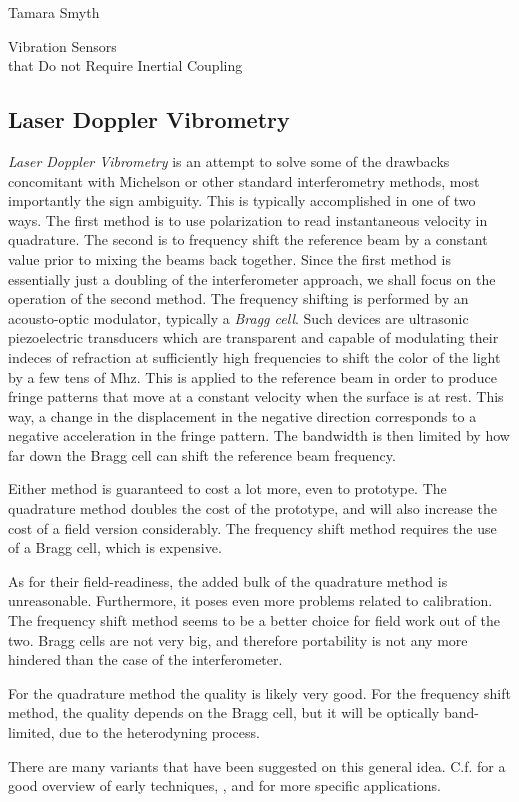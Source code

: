 \documentclass[a4paper,10pt]{report}
\numberwithin{equation}{section}
\begin{document}
\begin{chapter}{Tamara Smyth}
\begin{section}{Vibration Sensors \\that Do not Require Inertial Coupling}
 \subsection{Laser Doppler Vibrometry}
 \emph{Laser Doppler Vibrometry} is an attempt to solve some of the drawbacks concomitant with Michelson or other standard interferometry methods, most importantly the sign ambiguity. \cite{Giuliani2003}
 This is typically accomplished in one of two ways. The first method is to use polarization to read instantaneous velocity in quadrature. The second is to frequency shift the reference beam by a constant value prior to mixing the beams back together.\cite{Giuliani2003}
 Since the first method is essentially just a doubling of the interferometer approach, we shall focus on the operation of the second method. The frequency shifting is performed by an acousto-optic modulator, typically a \emph{Bragg cell}. Such devices are ultrasonic piezoelectric transducers which are transparent and capable of modulating their indeces of refraction at sufficiently high frequencies to shift the color of the light by a few tens of Mhz. This is applied to the reference beam in order to produce fringe patterns that move at a constant velocity when the surface is at rest. This way, a change in the displacement in the negative direction corresponds to a negative acceleration in the fringe pattern. The bandwidth is then limited by how far down the Bragg cell can shift the reference beam frequency.\cite[p.~241]{Baker1990}
 
 Either method is guaranteed to cost a lot more, even to prototype. The quadrature method doubles the cost of the prototype, and will also increase the cost of a field version considerably. The frequency shift method requires the use of a Bragg cell, which is expensive.
 
 As for their field-readiness, the added bulk of the quadrature method is unreasonable. Furthermore, it poses even more problems related to calibration. The frequency shift method seems to be a better choice for field work out of the two. Bragg cells are not very big, and therefore portability is not any more hindered than the case of the interferometer.
 
For the quadrature method the quality is likely very good. For the frequency shift method, the quality depends on the Bragg cell, but it will be optically band-limited, due to the heterodyning process.
 
 There are many variants that have been suggested on this general idea. C.f. \cite{Pickering1986} for a good overview of early techniques, \cite{Baker1990}, and \cite{Roos1996} for more specific applications. 

\end{section}
\end{chapter}
\end{document}
